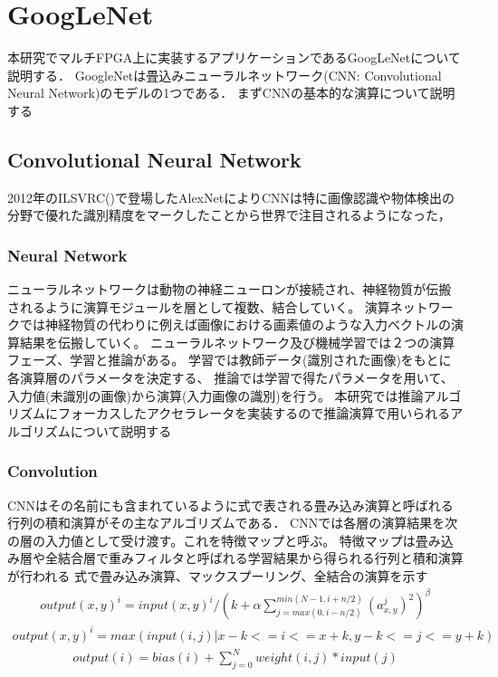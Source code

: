 \chapter{GoogLeNet}
{
\label{chap:googlenet}
本研究でマルチFPGA上に実装するアプリケーションであるGoogLeNetについて説明する．
GoogleNetは畳込みニューラルネットワーク(CNN: Convolutional Neural Network)のモデルの1つである．
まずCNNの基本的な演算について説明する
\section{Convolutional Neural Network}
\label{sec:cnn}
2012年のILSVRC()で登場したAlexNetによりCNNは特に画像認識や物体検出の分野で優れた識別精度をマークしたことから世界で注目されるようになった，
\subsection{Neural Network}
\label{sec:nn}
ニューラルネットワークは動物の神経ニューロンが接続され、神経物質が伝搬されるように演算モジュールを層として複数、結合していく。
演算ネットワークでは神経物質の代わりに例えば画像における画素値のような入力ベクトルの演算結果を伝搬していく。
ニューラルネットワーク及び機械学習では２つの演算フェーズ、学習と推論がある。
学習では教師データ(識別された画像)をもとに各演算層のパラメータを決定する、
推論では学習で得たパラメータを用いて、入力値(未識別の画像)から演算(入力画像の識別)を行う。
本研究では推論アルゴリズムにフォーカスしたアクセラレータを実装するので推論演算で用いられるアルゴリズムについて説明する
\subsection{Convolution}
\label{sec:conv}
CNNはその名前にも含まれているように式で表される畳み込み演算と呼ばれる行列の積和演算がその主なアルゴリズムである．
CNNでは各層の演算結果を次の層の入力値として受け渡す。これを特徴マップと呼ぶ。
特徴マップは畳み込み層や全結合層で重みフィルタと呼ばれる学習結果から得られる行列と積和演算が行われる
式で畳み込み演算、マックスプーリング、全結合の演算を示す
\begin{eqnarray}
	output(x, y)^{i} = input(x, y)^{i} / (k + \alpha \sum_{j=max(0, i-n/2)}^{min(N-1, i+n/2)} (a^j_{x, y})^2)^\beta
\end{eqnarray}
\begin{eqnarray}
	output(x, y)^{i} = max(input(i, j) | x-k <= i <= x+k, y-k <= j <= y+k)
\end{eqnarray}
\begin{eqnarray}
  output(i) = bias(i) + \sum_{j=0}^{N} weight(i, j) * input(j)
\end{eqnarray}

}
